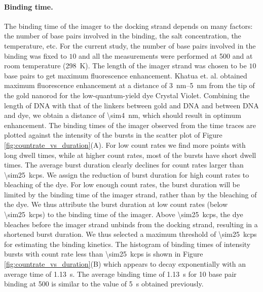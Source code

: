 \paragraph*{Binding time.}
The binding time of the imager to the docking strand depends on many factors: the number of base pairs involved in the binding, the salt concentration, the temperature, etc.
For the current study, the number of base pairs involved in the binding was fixed to $10$ and all the measurements were performed at \SI{500}{\mM}  and at room temperature (\SI{298}{\kelvin}).
The length of the imager strand was chosen to be $10$ base pairs to get maximum fluorescence enhancement.
Khatua et. al. obtained maximum fluorescence enhancement at a distance of \SIrange{3}{5}{\nm} from the tip of the gold nanorod for the low-quantum-yield dye Crystal Violet.\cite{khatua2014resonant}
Combining the length of DNA with that of the linkers between gold and DNA and between DNA and dye, we obtain a distance of \SI{\sim4}{\nm}, which should result in optimum enhancement.
The binding times of the imager observed from the time traces are plotted against the intensity of the bursts in the scatter plot of Figure \ref{fig:countrate_vs_duration}(A).
For low count rates we find more points with long dwell times, while at higher count rates, most of the bursts have short dwell times. 
The average burst duration clearly declines for count rates larger than \SI{\sim25}{kcps}.
We assign the reduction of burst duration for high count rates to bleaching of the dye. For low enough count rates, the burst duration will be limited by the binding time of the imager strand, rather than by the bleaching of the dye. We thus attribute the burst duration at low count rates (below \SI{\sim25}{kcps}) to the binding time of the imager.
Above \SI{\sim25}{kcps}, the dye bleaches before the imager strand unbinds from the docking strand, resulting in a shortened burst duration. We thus selected a maximum threshold of \SI{\sim25}{kcps} for estimating the binding kinetics. The histogram of binding times of intensity bursts with count rate less than \SI{\sim25}{kcps} is shown in Figure \ref{fig:countrate_vs_duration}(B) which appears to decay exponentially with an average time of \SI{1.13}{\s}. The average binding time of \SI{1.13}{\s} for 10 base pair binding at \SI{500}{\mM}  is similar to the value of \SI{5}{\s} obtained previously.\cite{jungmann2010singlemolecule}

